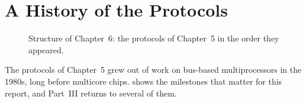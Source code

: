 \chapter{A History of the Protocols}
\label{ch:history}

\begin{figure}[htbp]
\centering
{}
\caption[]{Structure of Chapter~6: the protocols of
Chapter~5 in the order they appeared.}
\label{fig:ch6-map}
\end{figure}

The protocols of Chapter~5 grew out of work on bus-based multiprocessors in the
1980s, long before multicore chips.  shows the milestones that
matter for this report, and Part~III returns to several of them.

